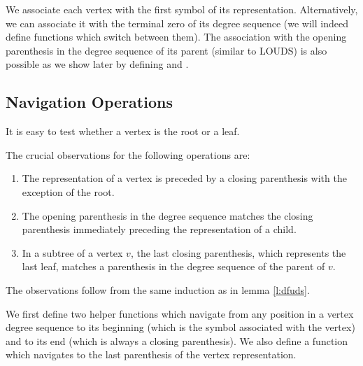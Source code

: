 We associate each vertex with the first symbol of its representation.
Alternatively, we can associate it with the terminal zero of its degree sequence (we will indeed define functions which switch between them).
The association with the opening parenthesis in the degree sequence of its parent (similar to LOUDS) is also possible as we show later by defining \dfudsRank{} and \dfudsSelect{}.

\subsection{Navigation Operations}

It is easy to test whether a vertex is the root or a leaf.

\begin{algorithm}
\begin{algorithmic}
	\State {} 
\EndFunction
\end{algorithmic}
\end{algorithm}

\begin{algorithm}
\begin{algorithmic}
	\State {} 
\EndFunction
\end{algorithmic}
\end{algorithm}

The crucial observations for the following operations are:
\begin{enumerate}
	\item The representation of a vertex is preceded by a closing parenthesis with the exception of the root.
	\item The opening parenthesis in the degree sequence matches the closing parenthesis immediately preceding the representation of a child.
	\item In a subtree of a vertex $v$, the last closing parenthesis, which represents the last leaf, matches a parenthesis in the degree sequence of the parent of $v$.
\end{enumerate}
The observations follow from the same induction as in lemma \ref{l:dfuds}.

\bigbreak

We first define two helper functions which navigate from any position in a vertex degree sequence to its beginning (which is the symbol associated with the vertex) and to its end (which is always a closing parenthesis).
We also define a function which navigates to the last parenthesis of the vertex representation.

